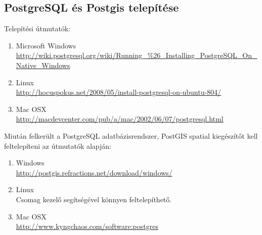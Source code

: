\subsection{PostgreSQL és Postgis telepítése} %
\label{sub:postgresql_és_postgis_telepítése}
Telepítési útmutatók:
\begin{enumerate}
  \item Microsoft Windows\\
  \url{http://wiki.postgresql.org/wiki/Running_%26_Installing_PostgreSQL_On_Native_Windows}
  \item Linux \\
  \url{http://hocuspokus.net/2008/05/install-postgresql-on-ubuntu-804/}
  \item Mac OSX \\
  \url{http://macdevcenter.com/pub/a/mac/2002/06/07/postgresql.html}
\end{enumerate}
Miután felkerült a PostgreSQL adatbázisrendszer, PostGIS spatial kiegészítőt kell feltelepíteni az útmutatók alapján:
\begin{enumerate}
  \item Windows \\
  \url{http://postgis.refractions.net/download/windows/}
  \item Linux \\
  Csomag kezelő segítségével könnyen feltelepíthető.
  \item Mac OSX \\
  \url{http://www.kyngchaos.com/software:postgres}
\end{enumerate}

